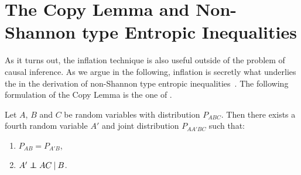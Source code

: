 \section{The Copy Lemma and Non-Shannon type Entropic Inequalities}\label{sec:NonShannon}

As it turns out, the inflation technique is also useful outside of the problem of causal inference. As we argue in the following, inflation is secretly what underlies the  in the derivation of non-Shannon type entropic inequalities~\cite[Chapter~15]{yeung_network_2008}. The following formulation of the Copy Lemma is the one of \citet{kaced_equivalence_2013}.

\begin{lemma}
	Let $A$, $B$ and $C$ be random variables with distribution $P_{ABC}$. Then there exists a fourth random variable $A'$ and joint distribution $P_{AA'BC}$ such that:
	\begin{enumerate}
		\item $P_{AB} = P_{A'B}$,
		\item $A' \perp\!\!\!\!\perp AC \:|\: B$.
	\label{copylemma}
	\end{enumerate}
\end{lemma}

